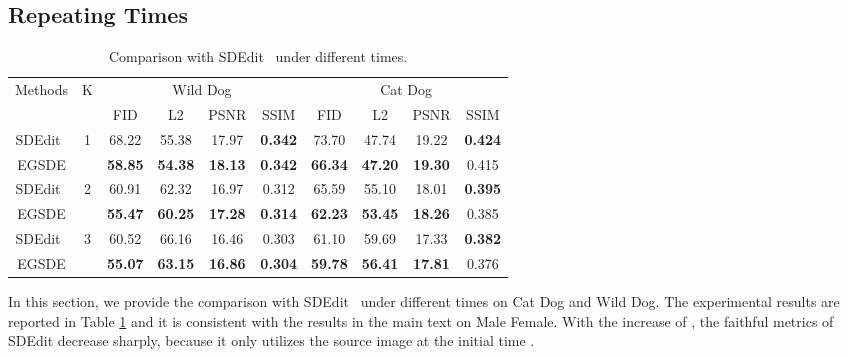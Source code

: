 \documentclass{article}
\begin{document}
\subsection{Repeating  Times}
\label{sec:repeating K}
\begin{table}[]
\caption{Comparison with SDEdit~\cite{meng2021sdedit} under different  times.}
\label{tb : K time appendix}
\centering
\vspace{.2cm}
\renewcommand\arraystretch{1.2}
\begin{tabular}{cccccccccc}
\toprule
\multirow{2}{*}{Methods} & \multirow{2}{*}{K} & \multicolumn{4}{c}{Wild  Dog}  & \multicolumn{4}{c}{Cat  Dog} \\
 \cmidrule(r){3-6}
 \cmidrule(r){7-10}
                         &                    & FID   & L2    & PSNR  & SSIM   & FID    & L2     & PSNR   & SSIM   \\
\midrule
SDEdit~\cite{meng2021sdedit}                  &  \multirow{2}{*}{1}                  & 68.22 & 55.38 & 17.97 & \textbf{0.342 }       & 73.70  & 47.74   & 19.22 & \textbf{0.424 }   \\
EGSDE                   &                   & \textbf{58.85} & \textbf{54.38} & \textbf{18.13} & \textbf{0.342} & \textbf{66.34} & \textbf{47.20}  & \textbf{19.30}  & 0.415 \\
\hdashline
SDEdit~\cite{meng2021sdedit}                    & \multirow{2}{*}{2}                   & 60.91 & 62.32 & 16.97 & 0.312 & 65.59          & 55.10           & 18.01          & \textbf{0.395}      \\
EGSDE                    &                   & \textbf{55.47} & \textbf{60.25} & \textbf{17.28} & \textbf{0.314} & \textbf{62.23} & \textbf{53.45} & \textbf{18.26} & 0.385\\
\hdashline
SDEdit~\cite{meng2021sdedit}                    & \multirow{2}{*}{3}                  & 60.52 & 66.16 & 16.46 & 0.303 & 61.10           & 59.69          & 17.33          & \textbf{0.382}     \\
EGSDE                   &                   & \textbf{55.07} & \textbf{63.15} & \textbf{16.86} & \textbf{0.304} & \textbf{59.78} & \textbf{56.41} & \textbf{17.81} & 0.376 \\
\bottomrule
\end{tabular}
\end{table}
In this section, we provide the comparison with SDEdit~\cite{meng2021sdedit} under different  times on Cat  Dog and Wild  Dog. The experimental results are reported in Table \ref{tb : K time appendix} and it is consistent with the results in the main text on Male  Female. With the increase of , the faithful metrics of SDEdit decrease sharply, because it only utilizes the source image at the initial time . 
\end{document}
